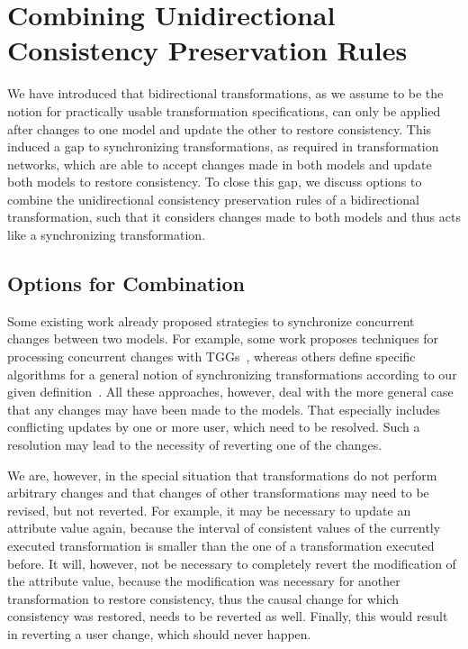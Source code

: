 \section{Combining Unidirectional Consistency Preservation Rules}

We have introduced that bidirectional transformations, as we assume to be the notion for practically usable transformation specifications, can only be applied after changes to one model and update the other to restore consistency.
This induced a gap to synchronizing transformations, as required in transformation networks, which are able to accept changes made in both models and update both models to restore consistency.
To close this gap, we discuss options to combine the unidirectional consistency preservation rules of a bidirectional transformation, such that it considers changes made to both models and thus acts like a synchronizing transformation.


\subsection{Options for Combination}

Some existing work already proposed strategies to synchronize concurrent changes between two models.
For example, some work proposes techniques for processing concurrent changes with \glspl{TGG}~\cite{hermann2012concurrentSynchronization-FASE,orejas2020IncrementalConcurrentSynchronization-FASE}, whereas others define specific algorithms for a general notion of synchronizing transformations according to our given definition~\cite{xiong2013SynchronizingConcurrentUpdates-SoSym,xiong2009parallelUpdates-ICMT}.
All these approaches, however, deal with the more general case that any changes may have been made to the models.
That especially includes conflicting updates by one or more user, which need to be resolved.
Such a resolution may lead to the necessity of reverting one of the changes.

We are, however, in the special situation that transformations do not perform arbitrary changes and that changes of other transformations may need to be revised, but not reverted.
For example, it may be necessary to update an attribute value again, because the interval of consistent values of the currently executed transformation is smaller than the one of a transformation executed before.
It will, however, not be necessary to completely revert the modification of the attribute value, because the modification was necessary for another transformation to restore consistency, thus the causal change for which consistency was restored, needs to be reverted as well.
Finally, this would result in reverting a user change, which should never happen.

